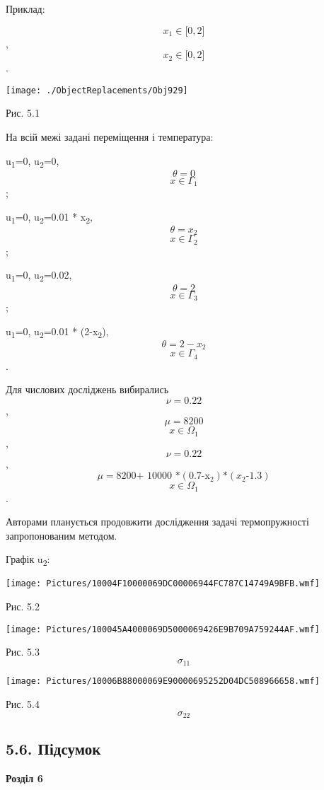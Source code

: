 Приклад:

\[{x_{1}\in\lbrack 0,2\rbrack}{}\], \[{x_{2}\in\lbrack 0,2\rbrack}{}\].

\texttt{[image: ./ObjectReplacements/Obj929]}

Рис. 5.1

На всій межі задані переміщення і температура:

u\textsubscript{1}=0, u\textsubscript{2}=0,
\[{\theta = 0}{}\]\[{x\in\Gamma_{1}}{}\];

u\textsubscript{1}=0, u\textsubscript{2}=0.01 * x\textsubscript{2},
\[{\theta = x_{2}}{}\] \[{x\in\Gamma_{2}}{}\];

u\textsubscript{1}=0, u\textsubscript{2}=0.02, \[{\theta = 2}{}\]
\[{x\in\Gamma_{3}}{}\];

u\textsubscript{1}=0, u\textsubscript{2}=0.01 * (2-x\textsubscript{2}),
\[{\theta = {2 - x_{2}}}{}\]\[{x\in\Gamma_{4}}{}\].

Для числових досліджень виби­рались \[{{\nu = 0}\text{.}\text{22}}{}\],
\[{\mu = \text{8200}}{}\] \[{x\in\Omega{}_{1}}{}\],
\[{{\nu = 0}\text{.}\text{22}}{}\],
\[{{\mu = \text{8200+\ 10000\ *}}(0\text{.}\text{7-x}_{2})\text{*}(x_{2}\text{-1}\text{.}3)}{}\]
\[{x\in\Omega_{1}}{}\].

Авторами планується продовжити дослідження задачі термопружності
запропонованим методом.

Графік u\textsubscript{2}:

\texttt{[image: Pictures/10004F10000069DC00006944FC787C14749A9BFB.wmf]}

Рис. 5.2

\texttt{[image: Pictures/100045A4000069D5000069426E9B709A759244AF.wmf]}

Рис. 5.3\[\sigma_{\text{11}}{}\]

\texttt{[image: Pictures/10006B88000069E90000695252D04DC508966658.wmf]}

Рис. 5.4\[\sigma_{\text{22}}{}\]

\hypertarget{ux43fux456ux434ux441ux443ux43cux43eux43a-3}{%
\subsection[5.6.
Підсумок]{\texorpdfstring{\protect\hypertarget{anchor-66}{}{}5.6.
Підсумок}{5.6. Підсумок}}\label{ux43fux456ux434ux441ux443ux43cux43eux43a-3}}

\textbf{Розділ 6}

